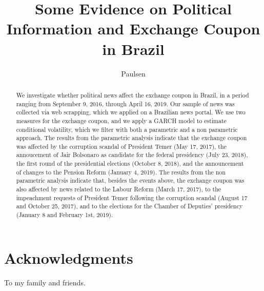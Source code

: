 \documentclass[cic,tc, english]{iiufrgs}
\title{Some Evidence on Political Information and Exchange Coupon in Brazil}
\author{Paulsen}{Bernardo Hillesheim}
\begin{document}
\maketitle


\chapter*{Acknowledgments}

To my family and friends. %



\begin{abstract}
    We investigate whether political news affect the exchange coupon in Brazil, in a period ranging from September 9, 2016, through April 16, 2019. Our sample of news was collected via web scrapping, which we applied on a Brazilian news portal. We use two measures for the exchange coupon, and we apply a GARCH model to estimate conditional volatility, which we filter with both a parametric and a non parametric approach. The results from the parametric analysis indicate that the exchange coupon was affected by the corruption scandal of President Temer (May 17, 2017), the annoucement of Jair Bolsonaro as candidate for the federal presidency (July 23, 2018), the first round of the presidential elections (October 8, 2018), and the announcement of changes to the Pension Reform (January 4, 2019). The results from the non parametric analysis indicate that, besides the events above, the exchange coupon was also affected by news related to the Labour Reform (March 17, 2017), to the impeachment requests of President Temer following the corruption scandal (August 17 and October 25, 2017), and to the elections for the Chamber of Deputies' presidency (January 8 and February 1st, 2019).
\end{abstract}
\end{document}

